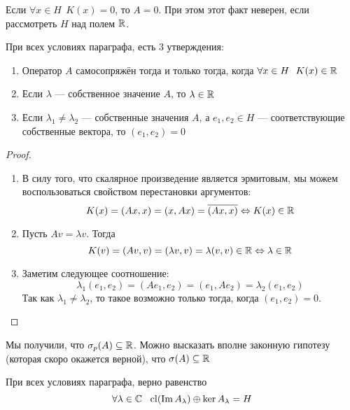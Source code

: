 \begin{exercise}
	Если $\forall x \in H\ \ K(x) = 0$, то $A = 0$. При этом этот факт неверен, если рассмотреть $H$ над полем $\mathbb{R}$.
\end{exercise}

\begin{theorem}
	При всех условиях параграфа, есть 3 утверждения:
	\begin{enumerate}
		\item Оператор $A$ самосопряжён тогда и только тогда, когда $\forall x \in H\ \ K(x) \in \mathbb{R}$
		
		\item Если $\lambda$ --- собственное значение $A$, то $\lambda \in \mathbb{R}$
		
		\item Если $\lambda_1 \neq \lambda_2$ --- собственные значения $A$, а $e_1, e_2 \in H$ --- соответствующие собственные вектора, то $(e_1, e_2) = 0$
	\end{enumerate}
\end{theorem}

\begin{proof}~
	\begin{enumerate}
		\item В силу того, что скалярное произведение является эрмитовым, мы можем воспользоваться свойством перестановки аргументов:
		\[
			K(x) = (Ax, x) = (x, Ax) = \overline{(Ax, x)} \Leftrightarrow K(x) \in \mathbb{R}
		\]
		
		\item Пусть $Av = \lambda v$. Тогда
		\[
			K(v) = (Av, v) = (\lambda v, v) = \lambda (v, v) \in \mathbb{R} \Leftrightarrow \lambda \in \mathbb{R}
		\]
		
		\item Заметим следующее соотношение:
		\[
			\lambda_1(e_1, e_2) = (Ae_1, e_2) = (e_1, Ae_2) = \lambda_2(e_1, e_2)
		\]
		Так как $\lambda_1 \neq \lambda_2$, то такое возможно только тогда, когда $(e_1, e_2) = 0$.
	\end{enumerate}
\end{proof}

\begin{note}
	Мы получили, что $\sigma_p(A) \subseteq \mathbb{R}$. Можно высказать вполне законную гипотезу (которая скоро окажется верной), что $\sigma(A) \subseteq \mathbb{R}$
\end{note}

\begin{theorem} \label{sao_fred_th}
	При всех условиях параграфа, верно равенство
	\[
		\forall \lambda \in \mathbb{C}\ \ \operatorname{cl}(\operatorname{Im} A_\lambda) \oplus \ker A_\lambda = H
	\]
\end{theorem}

